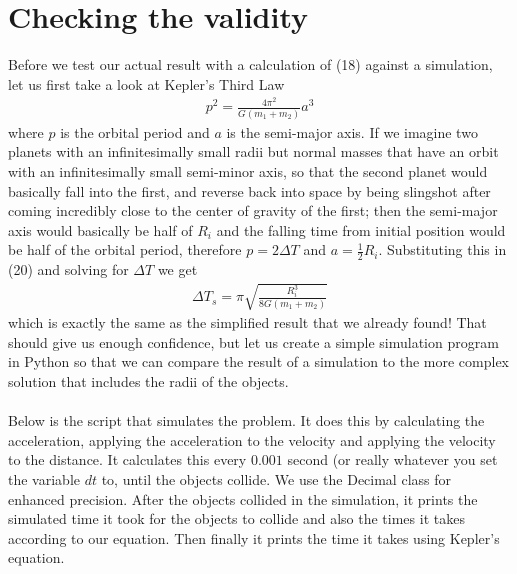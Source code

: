 \documentclass{article}
\begin{document}
\section{Checking the validity}
Before we test our actual result with a calculation of (18) against a simulation, let us first take a look at Kepler's Third Law
\begin{align}
    p^2 = \frac{4\pi^2}{G(m_1 + m_2)} a^3
\end{align}
where $p$ is the orbital period and $a$ is the semi-major axis. If we imagine two planets with an infinitesimally small radii but normal masses that have an orbit with an infinitesimally small semi-minor axis, so that the second planet would basically fall into the first, and reverse back into space by being slingshot after coming incredibly close to the center of gravity of the first; then the semi-major axis would basically be half of $R_i$ and the falling time from initial position would be half of the orbital period, therefore $p = 2\Delta T$ and $a = \frac{1}{2}R_i$. Substituting this in (20) and solving for $\Delta T$ we get
\begin{align}
    \Delta T_{s} =  \pi \sqrt{\frac{R_i^3}{8G(m_1 + m_2)}}
\end{align}
which is exactly the same as the simplified result that we already found! That should give us enough confidence, but let us create a simple simulation program in Python so that we can compare the result of a simulation to the more complex solution that includes the radii of the objects.\\
\\
Below is the script that simulates the problem. It does this by calculating the acceleration, applying the acceleration to the velocity and applying the velocity to the distance. It calculates this every $0.001$ second (or really whatever you set the variable $dt$ to, until the objects collide. We use the Decimal class for enhanced precision. After the objects collided in the simulation, it prints the simulated time it took for the objects to collide and also the times it takes according to our equation. Then finally it prints the time it takes using Kepler's equation.
\end{document}
